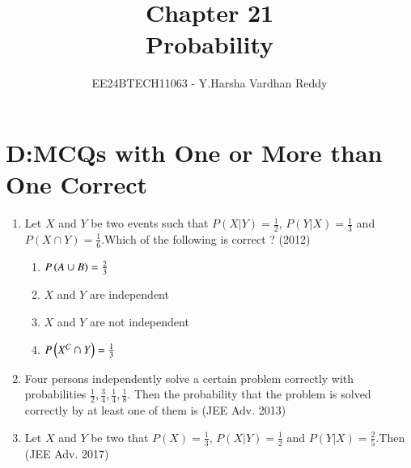 \documentclass[journal,,12pt,twocolumn]{IEEEtran}
\theoremstyle{remark}
\begin{document}

\vspace{3cm}

\title{Chapter 21 \\ Probability}
\author{EE24BTECH11063 - Y.Harsha Vardhan Reddy}
\maketitle
\newpage
\bigskip

\renewcommand{\thefigure}{\theenumi}
\renewcommand{\thetable}{\theenumi}
\section*{D:MCQs with One or More than One Correct}
\begin{enumerate}
    \item Let $X$ and $Y$ be two events such that $P(X|Y)=\frac{1}{2}$, $P(Y|X)=\frac{1}{3}$ and $P(X\cap Y)=\frac{1}{6}$.Which of the following is  correct ?
    \hfill{(2012)}
    \begin{enumerate}[label=\alph*)]
        \item $P\left(A\cup B\right)=\frac{2}{3}$
        \item $X$ and $Y$ are independent 
        \item $X$ and $Y$ are not independent
        \item $P\left(X^C \cap Y\right)=\frac{1}{3}$ 
        \end{enumerate}
        \item Four persons independently solve a certain problem correctly with probabilities $\frac{1}{2},\frac{3}{4},\frac{1}{4},\frac{1}{8}$. Then the probability that the problem is solved correctly by at least one of them is 
        \hfill{(JEE Adv. 2013)}
        \begin{enumerate}
        \end{enumerate}
        \item Let $X$ and $Y$ be two that $P(X)=\frac{1}{3}$, $P(X|Y)=\frac{1}{2}$ and $P(Y|X)=\frac{2}{5}$.Then 
        \hfill{(JEE Adv. 2017)}
        \begin{enumerate}

\end{enumerate}
\end{enumerate}
\end{document}
